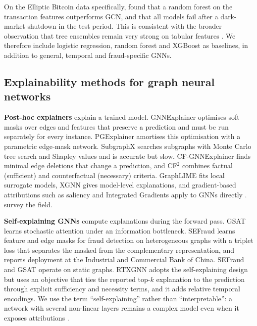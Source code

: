 On the Elliptic Bitcoin data specifically, \citet{weber2019anti} found that a random forest on the transaction features outperforms GCN, and that all models fail after a dark-market shutdown in the test period. This is consistent with the broader observation that tree ensembles remain very strong on tabular features \citep{grinsztajn2022tree}. We therefore include logistic regression, random forest \citep{breiman2001rf} and XGBoost \citep{chen2016xgboost} as baselines, in addition to general, temporal and fraud-specific GNNs.

\subsection{Explainability methods for graph neural networks}

\textbf{Post-hoc explainers} explain a trained model. GNNExplainer \citep{ying2019gnnexplainer} optimises soft masks over edges and features that preserve a prediction and must be run separately for every instance. PGExplainer \citep{luo2020pgexplainer} amortises this optimisation with a parametric edge-mask network. SubgraphX \citep{yuan2021subgraphx} searches subgraphs with Monte Carlo tree search and Shapley values and is accurate but slow. CF-GNNExplainer \citep{lucic2022cfgnnexplainer} finds minimal edge deletions that change a prediction, and CF$^2$ \citep{tan2022counterfactual} combines factual (sufficient) and counterfactual (necessary) criteria. GraphLIME \citep{huang2022graphlime} fits local surrogate models, XGNN \citep{yuan2020xgnn} gives model-level explanations, and gradient-based attributions such as saliency \citep{simonyan2014saliency} and Integrated Gradients \citep{sundararajan2017ig} apply to GNNs directly \citep{pope2019explainability, baldassarre2019explainability}. \citet{yuan2023explainability_survey} survey the field.

\textbf{Self-explaining GNNs} compute explanations during the forward pass. GSAT \citep{miao2022gsat} learns stochastic attention under an information bottleneck. SEFraud \citep{li2024sefraud} learns feature and edge masks for fraud detection on heterogeneous graphs with a triplet loss that separates the masked from the complementary representation, and reports deployment at the Industrial and Commercial Bank of China. SEFraud and GSAT operate on static graphs. RTXGNN adopts the self-explaining design but uses an objective that ties the reported top-$k$ explanation to the prediction through explicit sufficiency and necessity terms, and it adds relative temporal encodings. We use the term ``self-explaining'' rather than ``interpretable'': a network with several non-linear layers remains a complex model even when it exposes attributions \citep{rudin2019stop, lipton2018mythos}.

